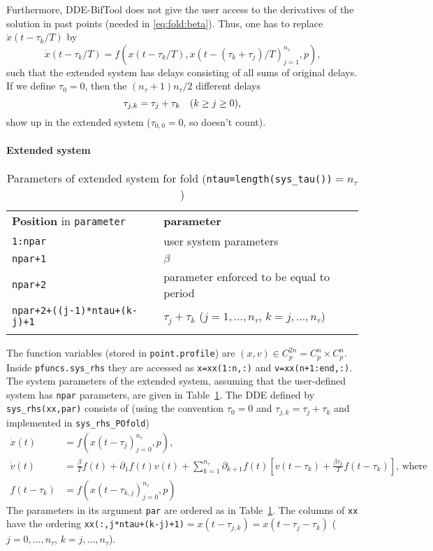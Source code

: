 \documentclass[11pt]{scrartcl}
\newcommand{\blist}[1]{\mbox{\lstinline!#1!}}
\begin{document}
Furthermore, DDE-BifTool does not give the user access to the
derivatives of the solution in past points (needed in
\eqref{eq:fold:beta}). Thus, one has to replace $\dot x(t-\tau_k/T)$ by
\begin{equation}
  \label{eq:fpastfold}
  \dot x(t-\tau_k/T)=f\left(x(t-\tau_k/T),
    x(t-(\tau_k+\tau_j)/T)_{j=1}^{n_\tau},p\right)\mbox{,}
\end{equation}
such that the extended system has delays consisting of all sums of
original delays. If we define $\tau_0=0$, then the
$(n_\tau+1)n_\tau/2$ different delays
\begin{displaymath}
  \tau_{j,k}=\tau_j+\tau_k\mbox{\quad ($k\geq j\geq0$),}
\end{displaymath}
show up in the extended system ($\tau_{0,0}=0$, so doesn't count).

\paragraph{Extended system}
\begin{table}[ht]
  \centering
  \begin{tabular}[t]{l@{\qquad}l}\hline\noalign{\medskip}
    \textbf{Position} in \blist{parameter} & \textbf{parameter}
    \\\noalign{\medskip}
    \blist{1:npar} & user system parameters\\
    \blist{npar+1} & $\beta$\\
    \blist{npar+2} & parameter enforced to be equal to period\\
    \blist{npar+2+((j-1)*ntau+(k-j)+1} & $\tau_j+\tau_k$ ($j=1,\ldots,n_\tau$, $k=j,\ldots,n_\tau$)\\\noalign{\medskip}\hline
  \end{tabular}
  \caption{Parameters of extended system for fold 
    (\blist{ntau=length(sys_tau())}$=n_\tau$)}
  \label{tab:foldpars}
\end{table}
The function variables (stored in \blist{point.profile}) are $(x,v)\in
C_p^{2n}=C_p^n\times C_p^n$. Inside \blist{pfuncs.sys_rhs} they are
accessed as \blist{x=xx(1:n,:)} and \blist{v=xx(n+1:end,:)}. The
system parameters of the extended system, assuming that the
user-defined system has \blist{npar} parameters, are given in
Table~\ref{tab:foldpars}.  The DDE defined by \blist{sys_rhs(xx,par)}
consists of (using the convention $\tau_{0}=0$ and
$\tau_{j,k}=\tau_j+\tau_k$ and implemented in \blist{sys_rhs_POfold})
\begin{align}
    \label{eq:po:impdde}
  \dot x(t)&= f\left(x(t-\tau_j)_{j=0}^{n_\tau},p\right)\mbox{,}\\
    \label{eq:fold:impdde}
    \dot v(t)&=\frac{\beta}{T}f(t)+\partial_1f(t)v(t)+\sum_{k=1}^{n_\tau}
    \partial_{k+1}f(t)\left[v(t-\tau_k)+\frac{\beta\tau_k}{T}f(t-\tau_k)\right]\mbox{, where}\\
    \nonumber
    f(t-\tau_k)&=f\left(x(t-\tau_{k,j})_{j=0}^{n_\tau},p\right)
\end{align}
The parameters in its argument \blist{par} are ordered as in
Table~\ref{tab:foldpars}. The columns of \blist{xx} have the ordering
\blist{xx(:,j*ntau+(k-j)+1)}$=x(t-\tau_{j,k})=x(t-\tau_j-\tau_k)$
($j=0,\ldots,n_\tau$, $k=j,\ldots,n_\tau$).
\end{document}
